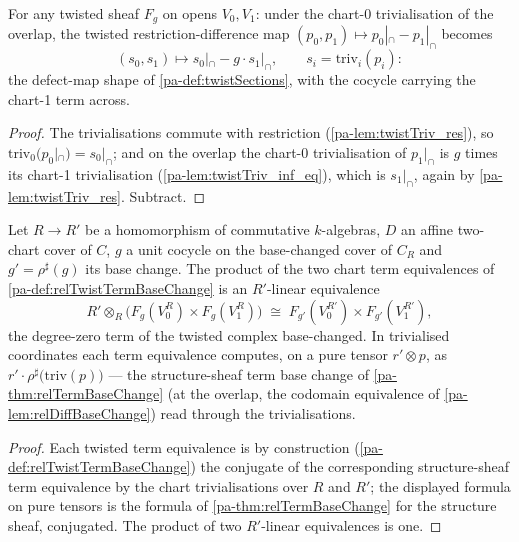 \begin{lemma}
  \label{pa-lem:twistTriv_pairDiff}
  \leanok

  For any twisted sheaf \(F_g\) on opens \(V_0, V_1\): under the chart-0
  trivialisation of the overlap, the twisted restriction-difference map
  \((p_0, p_1) \mapsto p_0|_{\cap} - p_1|_{\cap}\) becomes
  \[
    (s_0, s_1) \longmapsto s_0|_{\cap} - g \cdot s_1|_{\cap},
    \qquad s_i = \mathrm{triv}_i(p_i) :
  \]
  the defect-map shape of \ref{pa-def:twistSections}, with the cocycle carrying the
  chart-1 term across.
\end{lemma}
\begin{proof}
  \leanok
  The trivialisations commute with restriction (\ref{pa-lem:twistTriv_res}), so
  \(\mathrm{triv}_0(p_0|_{\cap}) = s_0|_{\cap}\); and on the overlap the chart-0
  trivialisation of \(p_1|_{\cap}\) is \(g\) times its chart-1 trivialisation
  (\ref{pa-lem:twistTriv_inf_eq}), which is \(s_1|_{\cap}\), again by
  \ref{pa-lem:twistTriv_res}. Subtract.
\end{proof}

\begin{definition}
  \label{pa-def:relTwistDomBaseChange}
  \leanok

  Let \(R \to R'\) be a homomorphism of commutative \(k\)-algebras, \(D\) an affine
  two-chart cover of \(C\), \(g\) a unit cocycle on the base-changed cover of \(C_R\)
  and \(g' = \rho^{\sharp}(g)\) its base change. The product of the two chart term
  equivalences of \ref{pa-def:relTwistTermBaseChange} is an \(R'\)-linear equivalence
  \[
    R' \otimes_R \bigl(F_g(V_0^R) \times F_g(V_1^R)\bigr) \;\cong\;
      F_{g'}(V_0^{R'}) \times F_{g'}(V_1^{R'}),
  \]
  the degree-zero term of the twisted complex base-changed. In trivialised coordinates
  each term equivalence computes, on a pure tensor \(r' \otimes p\), as
  \(r' \cdot \rho^{\sharp}\bigl(\mathrm{triv}(p)\bigr)\) --- the structure-sheaf term
  base change of \ref{pa-thm:relTermBaseChange} (at the overlap, the codomain equivalence
  of \ref{pa-lem:relDiffBaseChange}) read through the trivialisations.
\end{definition}
\begin{proof}
  \leanok
  Each twisted term equivalence is by construction
  (\ref{pa-def:relTwistTermBaseChange}) the conjugate of the corresponding
  structure-sheaf term equivalence by the chart trivialisations over \(R\) and
  \(R'\); the displayed formula on pure tensors is the formula of
  \ref{pa-thm:relTermBaseChange} for the structure sheaf, conjugated. The product of two
  \(R'\)-linear equivalences is one.
\end{proof}


